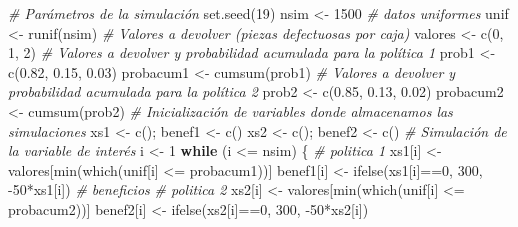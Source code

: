 \documentclass[
]{book}
\newenvironment{Shaded}{\begin{snugshade}}{\end{snugshade}}
\newcommand{\CommentTok}[1]{\textcolor[rgb]{0.56,0.35,0.01}{\textit{#1}}}
\newcommand{\ControlFlowTok}[1]{\textcolor[rgb]{0.13,0.29,0.53}{\textbf{#1}}}
\newcommand{\DecValTok}[1]{\textcolor[rgb]{0.00,0.00,0.81}{#1}}
\newcommand{\FloatTok}[1]{\textcolor[rgb]{0.00,0.00,0.81}{#1}}
\newcommand{\FunctionTok}[1]{\textcolor[rgb]{0.00,0.00,0.00}{#1}}
\newcommand{\NormalTok}[1]{#1}
\newcommand{\OtherTok}[1]{\textcolor[rgb]{0.56,0.35,0.01}{#1}}
\newcommand{\SpecialCharTok}[1]{\textcolor[rgb]{0.00,0.00,0.00}{#1}}
\theoremstyle{definition}
\theoremstyle{definition}
\theoremstyle{definition}
\theoremstyle{definition}
\theoremstyle{remark}
\begin{document}
\begin{Shaded}
\begin{Highlighting}[]
\CommentTok{\# Parámetros de la simulación}
\FunctionTok{set.seed}\NormalTok{(}\DecValTok{19}\NormalTok{)}
\NormalTok{nsim }\OtherTok{\textless{}{-}} \DecValTok{1500}
\CommentTok{\# datos uniformes}
\NormalTok{unif }\OtherTok{\textless{}{-}} \FunctionTok{runif}\NormalTok{(nsim)}
\CommentTok{\# Valores a devolver (piezas defectuosas por caja)}
\NormalTok{valores }\OtherTok{\textless{}{-}} \FunctionTok{c}\NormalTok{(}\DecValTok{0}\NormalTok{, }\DecValTok{1}\NormalTok{, }\DecValTok{2}\NormalTok{)}
\CommentTok{\# Valores a devolver y probabilidad acumulada para la política 1}
\NormalTok{prob1 }\OtherTok{\textless{}{-}} \FunctionTok{c}\NormalTok{(}\FloatTok{0.82}\NormalTok{, }\FloatTok{0.15}\NormalTok{, }\FloatTok{0.03}\NormalTok{)}
\NormalTok{probacum1 }\OtherTok{\textless{}{-}} \FunctionTok{cumsum}\NormalTok{(prob1)}
\CommentTok{\# Valores a devolver y probabilidad acumulada para la política 2}
\NormalTok{prob2 }\OtherTok{\textless{}{-}} \FunctionTok{c}\NormalTok{(}\FloatTok{0.85}\NormalTok{, }\FloatTok{0.13}\NormalTok{, }\FloatTok{0.02}\NormalTok{)}
\NormalTok{probacum2 }\OtherTok{\textless{}{-}} \FunctionTok{cumsum}\NormalTok{(prob2)}
\CommentTok{\# Inicialización de variables donde almacenamos las simulaciones}
\NormalTok{xs1 }\OtherTok{\textless{}{-}} \FunctionTok{c}\NormalTok{(); benef1 }\OtherTok{\textless{}{-}} \FunctionTok{c}\NormalTok{()}
\NormalTok{xs2 }\OtherTok{\textless{}{-}} \FunctionTok{c}\NormalTok{(); benef2 }\OtherTok{\textless{}{-}} \FunctionTok{c}\NormalTok{()}
\CommentTok{\# Simulación de la variable de interés}
\NormalTok{i }\OtherTok{\textless{}{-}} \DecValTok{1}
\ControlFlowTok{while}\NormalTok{ (i }\SpecialCharTok{\textless{}=}\NormalTok{ nsim)}
\NormalTok{\{}
  \CommentTok{\# politica 1}
\NormalTok{  xs1[i] }\OtherTok{\textless{}{-}}\NormalTok{ valores[}\FunctionTok{min}\NormalTok{(}\FunctionTok{which}\NormalTok{(unif[i] }\SpecialCharTok{\textless{}=}\NormalTok{ probacum1))] }
\NormalTok{  benef1[i] }\OtherTok{\textless{}{-}} \FunctionTok{ifelse}\NormalTok{(xs1[i]}\SpecialCharTok{==}\DecValTok{0}\NormalTok{, }\DecValTok{300}\NormalTok{, }\SpecialCharTok{{-}}\DecValTok{50}\SpecialCharTok{*}\NormalTok{xs1[i]) }\CommentTok{\# beneficios}
  \CommentTok{\# politica 2}
\NormalTok{  xs2[i] }\OtherTok{\textless{}{-}}\NormalTok{ valores[}\FunctionTok{min}\NormalTok{(}\FunctionTok{which}\NormalTok{(unif[i] }\SpecialCharTok{\textless{}=}\NormalTok{ probacum2))]  }
\NormalTok{  benef2[i] }\OtherTok{\textless{}{-}} \FunctionTok{ifelse}\NormalTok{(xs2[i]}\SpecialCharTok{==}\DecValTok{0}\NormalTok{, }\DecValTok{300}\NormalTok{, }\SpecialCharTok{{-}}\DecValTok{50}\SpecialCharTok{*}\NormalTok{xs2[i])}

\end{Highlighting}
\end{Shaded}
\end{document}
